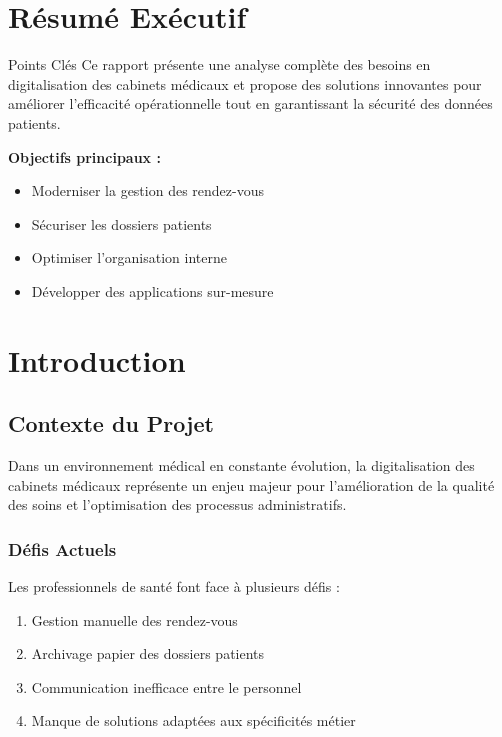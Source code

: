 \documentclass{modern-report}
\begin{document}
\makemoderncover

\tableofcontents
\clearpage

\chapter*{Résumé Exécutif}

\begin{modernbox}{Points Clés}
Ce rapport présente une analyse complète des besoins en digitalisation des cabinets médicaux et propose des solutions innovantes pour améliorer l'efficacité opérationnelle tout en garantissant la sécurité des données patients.

\modernseparator

\textbf{Objectifs principaux :}
\begin{itemize}
    \item Moderniser la gestion des rendez-vous
    \item Sécuriser les dossiers patients 
    \item Optimiser l'organisation interne
    \item Développer des applications sur-mesure
\end{itemize}
\end{modernbox}

\chapter{Introduction}

\section{Contexte du Projet}

Dans un environnement médical en constante évolution, la digitalisation des cabinets médicaux représente un enjeu majeur pour l'amélioration de la qualité des soins et l'optimisation des processus administratifs.

\subsection{Défis Actuels}

Les professionnels de santé font face à plusieurs défis :

\begin{enumerate}
    \item Gestion manuelle des rendez-vous
    \item Archivage papier des dossiers patients
    \item Communication inefficace entre le personnel
    \item Manque de solutions adaptées aux spécificités métier
\end{enumerate}
\end{document}
